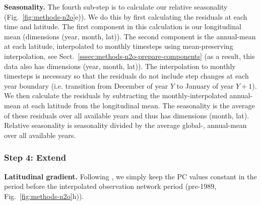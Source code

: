 \textbf{Seasonality.}
The fourth sub-step is to calculate our relative seasonality (Fig.~\ref{fig:methods-n2o}e)).
We do this by first calculating the residuals at each time and latitude.
The first component in this calculation is our longitudinal mean (dimensions (year, month, lat)).
The second component is the annual-mean at each latitude,
interpolated to monthly timesteps using mean-preserving interpolation, see Sect.~\ref{sssec:methods-n2o-prepare-components}
(as a result, this data also has dimensions (year, month, lat)).
The interpolation to monthly timesteps is necessary
so that the residuals do not include step changes at each year boundary
(i.e. transition from December of year $Y$ to January of year $Y + 1$).
We then calculate the residuals by subtracting the monthly-interpolated
annual-mean at each latitude from the longitudinal mean.
The seasonality is the average of these residuals over all available years
and thus has dimensions (month, lat).
Relative seasonality is seasonality divided by the average global-, annual-mean over all available years.

\subsubsection{Step 4: Extend}
\label{sssec:methods-n2o-extend}

\textbf{Latitudinal gradient.}
Following \cite{meinshausen_historical-ghgs_2017},
we simply keep the PC values constant in the period before the interpolated observation network period (pre-1989, Fig.~\ref{fig:methods-n2o}h)).

